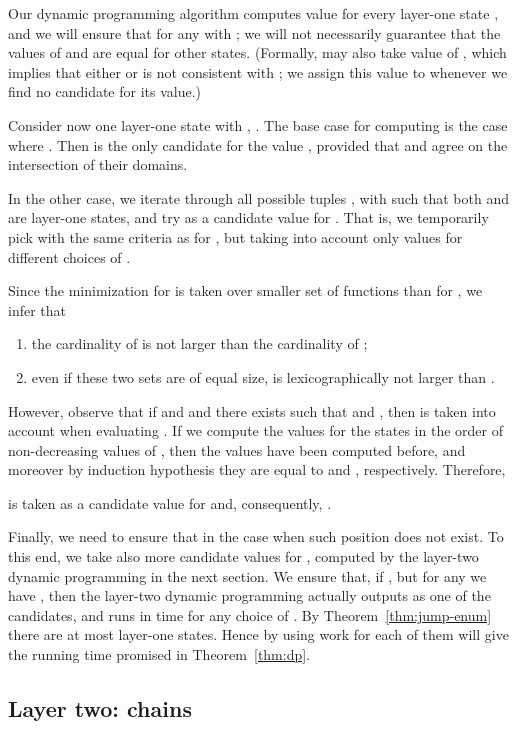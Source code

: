Our dynamic programming algorithm computes value  for every
layer-one state , and we will ensure that  for any  with ;
we will not necessarily guarantee that the values of 
and  are equal for other states.
(Formally,  may also take value of , which implies that either  or  is not consistent with ;
 we assign this value to  whenever we find no candidate for its value.)

Consider now one layer-one state  with 
, .
The base case for computing  is the case where .
Then  is the only candidate for the value , provided that  and  agree on the intersection of their domains.

In the other case, we iterate through all possible tuples
, with 
such that both  and  are layer-one states,
and try  as a candidate value for .
That is, we temporarily
pick  with the same criteria as for , but taking into
account only values  for different choices of .

Since the minimization for  is taken over smaller set of functions
than for , we infer that
\begin{enumerate}
\item the cardinality of  is not larger than the cardinality of ;
\item even if these two sets are of equal size,  is lexicographically
not larger than .
\end{enumerate}
However, observe that if  and 
and there exists  such that  and ,
    then  is taken into account when evaluating . If we compute the values for the states  in the order of non-decreasing values of , then the values  have been computed before, and moreover by induction hypothesis they are equal to  and , respectively. Therefore,

is taken as a candidate value for  and, consequently, .

Finally, we need to ensure that  in the case
when such position  does not exist. To this end, we take also more
candidate values for , computed by the layer-two dynamic programming
in the next section. We ensure that, if ,
 but for any  we have ,
then the layer-two dynamic programming actually outputs  as one of the candidates,
     and runs in time  for any choice of . By Theorem~\ref{thm:jump-enum} there are at most  layer-one states. Hence by using  work for each of them will give the running time promised in Theorem~\ref{thm:dp}.

\subsection{Layer two: chains}

